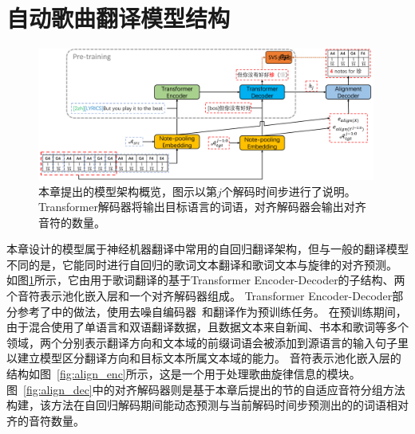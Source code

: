 \section{自动歌曲翻译模型结构}
\begin{figure}[t]
    \centering
    \includegraphics[width=0.99\textwidth]{figure/ast/pipeline_svs.pdf}
    \caption{本章提出的模型架构概览，图示以第$j$个解码时间步进行了说明。Transformer解码器将输出目标语言的词语，对齐解码器会输出对齐音符的数量。}
    \label{fig:model}
\end{figure}
本章设计的模型属于神经机器翻译中常用的自回归翻译架构，但与一般的翻译模型不同的是，它能同时进行自回归的歌词文本翻译和歌词文本与旋律的对齐预测。
如图\ref{fig:model}所示，它由用于歌词翻译的基于Transformer Encoder-Decoder的子结构、两个音符表示池化嵌入层和一个对齐解码器组成。
Transformer Encoder-Decoder部分参考了\citet{gagast}中的做法，使用去噪自编码器~\citep{bart}和翻译作为预训练任务。
在预训练期间，由于混合使用了单语言和双语翻译数据，且数据文本来自新闻、书本和歌词等多个领域，两个分别表示翻译方向和文本域的前缀词语会被添加到源语言的输入句子里以建立模型区分翻译方向和目标文本所属文本域的能力。
音符表示池化嵌入层的结构如图~\ref{fig:align_enc}所示，这是一个用于处理歌曲旋律信息的模块。
图~\ref{fig:align_dec}中的对齐解码器则是基于本章后提出的节的自适应音符分组方法构建，该方法在自回归解码期间能动态预测与当前解码时间步预测出的的词语相对齐的音符数量。
